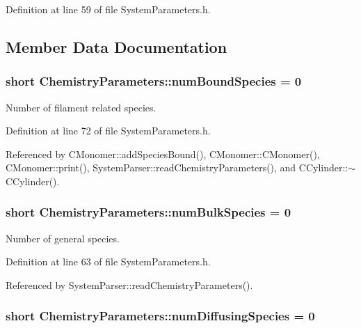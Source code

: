 Definition at line 59 of file System\+Parameters.\+h.



\subsection{Member Data Documentation}
\hypertarget{structChemistryParameters_a47fbf96b070976e8e0b7bb25a381ea54}{
\subsubsection[{num\+Bound\+Species}]{\setlength{\rightskip}{0pt plus 5cm}short Chemistry\+Parameters\+::num\+Bound\+Species = 0}}\label{structChemistryParameters_a47fbf96b070976e8e0b7bb25a381ea54}


Number of filament related species. 



Definition at line 72 of file System\+Parameters.\+h.



Referenced by C\+Monomer\+::add\+Species\+Bound(), C\+Monomer\+::\+C\+Monomer(), C\+Monomer\+::print(), System\+Parser\+::read\+Chemistry\+Parameters(), and C\+Cylinder\+::$\sim$\+C\+Cylinder().

\hypertarget{structChemistryParameters_a33f49ae4bed264d303989b7372b1ba4b}{
\subsubsection[{num\+Bulk\+Species}]{\setlength{\rightskip}{0pt plus 5cm}short Chemistry\+Parameters\+::num\+Bulk\+Species = 0}}\label{structChemistryParameters_a33f49ae4bed264d303989b7372b1ba4b}


Number of general species. 



Definition at line 63 of file System\+Parameters.\+h.



Referenced by System\+Parser\+::read\+Chemistry\+Parameters().

\hypertarget{structChemistryParameters_a78116d90c15faebd400cb5c75ce00e26}{
\subsubsection[{num\+Diffusing\+Species}]{\setlength{\rightskip}{0pt plus 5cm}short Chemistry\+Parameters\+::num\+Diffusing\+Species = 0}}\label{structChemistryParameters_a78116d90c15faebd400cb5c75ce00e26}


